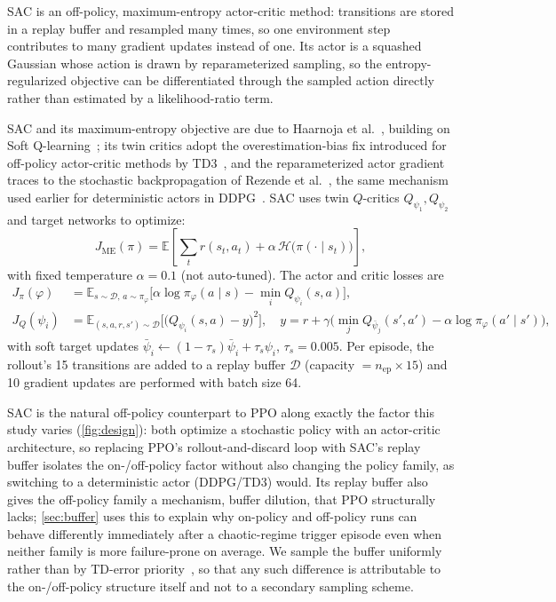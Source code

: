 SAC is an off-policy, maximum-entropy actor-critic method: transitions are
stored in a replay buffer and resampled many times, so one environment step
contributes to many gradient updates instead of one. Its actor is a
squashed Gaussian whose action is drawn by reparameterized sampling, so the
entropy-regularized objective can be differentiated through the sampled
action directly rather than estimated by a likelihood-ratio term.

SAC and its maximum-entropy objective are due to Haarnoja et
al.~\cite{sac2018,sacapps2018}, building on Soft
Q-learning~\cite{softq2017}; its twin critics adopt the overestimation-bias
fix introduced for off-policy actor-critic methods by
TD3~\cite{fujimoto2018td3}, and the reparameterized actor gradient traces to
the stochastic backpropagation of Rezende et
al.~\cite{rezende2014stochastic}, the same mechanism used earlier for
deterministic actors in DDPG~\cite{lillicrap2016ddpg}. SAC uses twin
$Q$-critics $Q_{\psi_1},Q_{\psi_2}$ and target networks to optimize:
\begin{equation}
  J_{\mathrm{ME}}(\pi)=\mathbb{E}\!\left[\textstyle\sum_t r(s_t,a_t)+\alpha\,\mathcal{H}\!\big(\pi(\cdot\mid s_t)\big)\right],
  \label{eq:sacobj}
\end{equation}
with fixed temperature $\alpha=0.1$ (not auto-tuned). The actor and critic
losses are
\begin{align}
  J_\pi(\varphi)     &=\mathbb{E}_{s\sim\mathcal{D},\,a\sim\pi_\varphi}\!\big[\alpha\log\pi_\varphi(a\mid s)-\min_i Q_{\psi_i}(s,a)\big],
  \label{eq:sacactor}\\
  J_Q(\psi_i)        &=\mathbb{E}_{(s,a,r,s')\sim\mathcal{D}}\!\Big[\big(Q_{\psi_i}(s,a)-y\big)^2\Big],\quad
  y=r+\gamma\big(\min_j Q_{\bar\psi_j}(s',a')-\alpha\log\pi_\varphi(a'\mid s')\big),
  \label{eq:saccritic}
\end{align}
with soft target updates
$\bar\psi_i\leftarrow(1-\tau_s)\bar\psi_i+\tau_s\psi_i$, $\tau_s=0.005$. Per
episode, the rollout's 15 transitions are added to a replay buffer $\mathcal{D}$
(capacity $=n_{\text{ep}}\times 15$) and 10 gradient updates are performed
with batch size 64.

SAC is the natural off-policy counterpart to PPO
along exactly the factor this study varies (\cref{fig:design}): both
optimize a stochastic policy with an actor-critic architecture, so replacing
PPO's rollout-and-discard loop with SAC's replay buffer isolates the
on-/off-policy factor without also changing the policy family, as switching
to a deterministic actor (DDPG/TD3) would. Its replay buffer also gives the
off-policy family a mechanism, buffer dilution, that PPO structurally lacks;
\cref{sec:buffer} uses this to explain why on-policy and off-policy runs can
behave differently immediately after a chaotic-regime trigger episode even
when neither family is more failure-prone on average. We sample the buffer
uniformly rather than by TD-error priority~\cite{schaul2016per}, so that any
such difference is attributable to the on-/off-policy structure itself and
not to a secondary sampling scheme.

